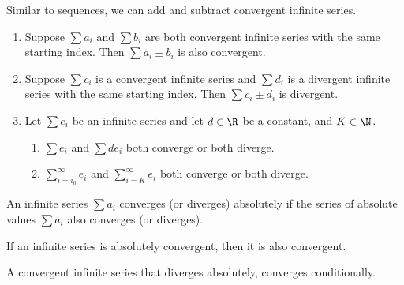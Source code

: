 \documentclass{article}
\begin{document}
\begin{tcolorboxlarge}
    \begin{theorem}
        Similar to sequences, we can add and subtract convergent infinite series.
    \end{theorem}
    \begin{enumerate}
        \item Suppose $\sum a_i$ and $\sum b_i$ are both convergent infinite series with the same starting index. Then $\sum a_i \pm b_i$ is also convergent.
        \item Suppose $\sum c_i$ is a convergent infinite series and $\sum d_i$ is a divergent infinite series with the same starting index. Then $\sum c_i \pm d_i$ is divergent.
        \item Let $\sum e_i$ be an infinite series and let $d\in\R$ be a constant, and $K\in\N$.
                \begin{enumerate}
                    \item $\sum e_i$ and $\sum d e_i$ both converge or both diverge.
                    \item $\sum_{i=i_0}^\infty e_i$ and $\sum_{i=K}^\infty e_i$ both converge or both diverge.
                \end{enumerate}
    \end{enumerate}
\end{tcolorboxlarge}
%
\begin{definition}
    An infinite series $\sum a_i$ converges (or diverges) absolutely if the series of absolute values $\sum a_i$ also converges (or diverges).
\end{definition}
\begin{theorem}
    If an infinite series is absolutely convergent, then it is also convergent.
\end{theorem}
%
\begin{definition}
    A convergent infinite series that diverges absolutely, converges \linebreak conditionally.
\end{definition}
%
\pagebreak
\end{document}
